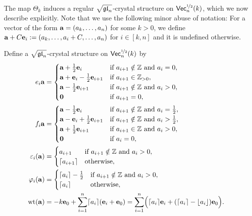 \documentclass[11pt]{article}
\begin{document}
The map $\Theta_k$ induces a regular $\sqrt{\mathfrak{gl}_n}$-crystal structure on $\mathsf{Vec}^{\nicefrac{1}{2}}_n(k)$, which we now describe explicitly.
Note that we use the following minor abuse of notation: For a vector of the form $\mathbf{a} = (a_k, \dotsc, a_n)$ for some $k > 0$, we define $\mathbf{a} + C\textbf{e}_i := (a_k,\dotsc, a_i + C,\dotsc,a_n)$ for $i \in [k, n]$ and it is undefined otherwise.

\begin{definition}
\label{def:vec_crystal} 
Define a $\sqrt{\mathfrak{gl}_n}$-crystal structure on $\mathsf{Vec}^{\nicefrac{1}{2}}_n(k)$ by
\begin{subequations}
\begin{align}
e_i \bfa & = \begin{cases}
	\bfa + \frac{1}{2} \e_i & \text{if } a_{i+1} \notin \ZZ \text{ and } a_i = 0, \\
	\bfa + \e_i - \frac{1}{2} \e_{i+1} & \text{if } a_{i+1} \in \ZZ_{>0}, \\
	\bfa - \frac{1}{2} \e_{i+1} & \text{if } a_{i+1} \notin \ZZ \text{ and } a_i > 0, \\
	\zero & \text{if } a_{i+1} = 0,
\end{cases}  \label{eq:vec_e}
\allowdisplaybreaks \\
f_i \bfa & = \begin{cases}
	\bfa - \frac{1}{2} \e_i & \text{if } a_{i+1} \notin \ZZ \text{ and } a_i = \frac{1}{2}, \\
	\bfa - \e_i + \frac{1}{2} \e_{i+1} & \text{if } a_{i+1} \notin \ZZ \text{ and } a_i > \frac{1}{2}, \\
	\bfa + \frac{1}{2} \e_{i+1} & \text{if } a_{i+1} \in \ZZ \text{ and } a_i > 0, \\
	\zero & \text{if } a_i = 0,
\end{cases}
\allowdisplaybreaks \\
\varepsilon_i(\bfa) & = \begin{cases} a_{i+1} & \text{if } a_{i+1} \notin \ZZ \text{ and } a_i > 0, \\ \lceil a_{i+1}\rceil & \text{otherwise}, \end{cases}  \label{eq:vec_ep}
\allowdisplaybreaks \\
\varphi_i(\bfa) & = \begin{cases} \lceil a_i \rceil - \frac{1}{2} & \text{if } a_{i+1} \notin \ZZ \text{ and } a_i > 0, \\ \lceil a_i \rceil & \text{otherwise}, \end{cases}
\allowdisplaybreaks \\
\weight(\bfa) & = -k \e_0 + \sum_{i=1}^n \lceil a_i \rceil (\e_i + \e_0) = \sum_{i=1}^n\Bigl( \lceil a_i \rceil \e_i + (\lceil a_i \rceil - \lfloor a_i \rfloor ) \e_0\Bigr).
\end{align}
\end{subequations}
\end{definition}
\end{document}
